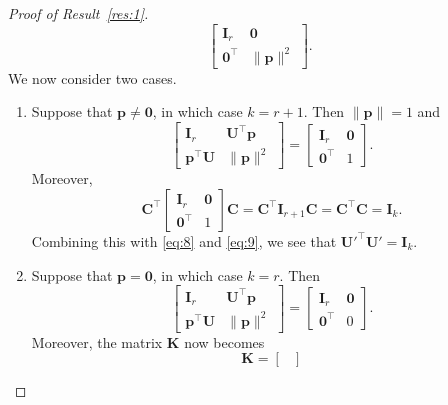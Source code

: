 \documentclass[11pt,a4paper]{article}
\theoremstyle{break}
\numberwithin{dummy}{section}
\theoremstyle{plain}
\theoremstyle{plain}
\theoremstyle{plain}
\theoremstyle{plain}
\theoremstyle{plain}
\theoremstyle{MyNonumberplain}
\newtheorem{proof}{Proof}
\newcommand{\0}{\M{0}}
\newcommand{\M}[1]{\mathbf{#1}}
\newcommand{\T}{\top}
\newcommand{\ve}[1]{\mathbf{#1}}
\begin{document}
\begin{proof}[Proof of Result~\ref{res:1}]
\begin{displaymath}
\begin{bmatrix}
      \M{I}_r & \0 \\
      \0^\T& \| \ve{p} \|^2
    \end{bmatrix}.
  \end{displaymath}
  We now consider two cases.
  \begin{enumerate}[font=\upshape,label=(\roman*),wide,align=right]
  \item Suppose that $\ve{p} \neq \0$, in which case $k = r+1$. Then $\| \ve{p} \| = 1$ and
    \begin{equation}
      \label{eq:9}
      \begin{bmatrix}
        \M{I}_r & \M{U}^\T \ve{p}
        \\
        \ve{p}^\T \M{U} & \| \ve{p} \|^2
      \end{bmatrix}
      =
      \begin{bmatrix}
        \M{I}_r & \0 \\
        \0^\T& 1
      \end{bmatrix}.
    \end{equation}
    Moreover,
    \begin{displaymath}
      \M{C}^\T
      \begin{bmatrix}
        \M{I}_r & \0 \\
        \0^\T& 1
      \end{bmatrix}
      \M{C}
      =
      \M{C}^\T \M{I}_{r+1} \M{C}
      =
      \M{C}^\T \M{C}
      = \M{I}_k.
    \end{displaymath}
    Combining this with \eqref{eq:8} and \eqref{eq:9}, we see that
    \begin{math}
      \M{U}'^\T \M{U}' = \M{I}_k.
    \end{math}
  \item Suppose that $\ve{p} = \0$, in which case $k = r$. Then
    \begin{equation}
      \label{eq:10}
      \begin{bmatrix}
        \M{I}_r & \M{U}^\T \ve{p} \\
        \ve{p}^\T \M{U} & \| \ve{p} \|^2
      \end{bmatrix}
      =
      \begin{bmatrix}
        \M{I}_r & \0 \\
        \0^\T & 0
      \end{bmatrix}.
    \end{equation}
    Moreover, the matrix $\M{K}$ now becomes
    \begin{displaymath}
      \M{K} =
      \begin{bmatrix}

\end{bmatrix}
\end{displaymath}
\end{enumerate}
\end{proof}
\end{document}
